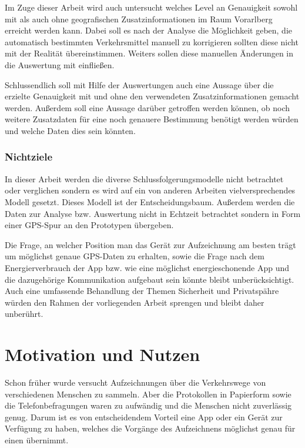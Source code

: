 Im Zuge dieser Arbeit wird auch untersucht welches Level an Genauigkeit sowohl mit als auch ohne geografischen Zusatzinformationen im Raum Vorarlberg erreicht werden kann. Dabei soll es nach der Analyse die Möglichkeit geben, die automatisch bestimmten Verkehrsmittel manuell zu korrigieren sollten diese nicht mit der Realität übereinstimmen. Weiters sollen diese manuellen Änderungen in die Auswertung mit einfließen. 

Schlussendlich soll mit Hilfe der Auswertungen auch eine Aussage über die erzielte Genauigkeit mit und ohne den verwendeten Zusatzinformationen gemacht werden. Außerdem soll eine Aussage darüber getroffen werden können, ob noch weitere Zusatzdaten für eine noch genauere Bestimmung benötigt werden würden und welche Daten dies sein könnten. 

\subsubsection{Nichtziele}

In dieser Arbeit werden die diverse Schlussfolgerungsmodelle nicht betrachtet oder verglichen sondern es wird auf ein von anderen Arbeiten vielversprechendes Modell gesetzt. Dieses Modell ist der Entscheidungsbaum. Außerdem werden die Daten zur Analyse bzw. Auswertung nicht in Echtzeit betrachtet sondern in Form einer GPS-Spur an den Prototypen übergeben.

Die Frage, an welcher Position man das Gerät zur Aufzeichnung am besten trägt um möglichst genaue GPS-Daten zu erhalten, sowie die Frage nach dem Energierverbrauch der App bzw. wie eine möglichst energieschonende App und die dazugehörige Kommunikation aufgebaut sein könnte bleibt unberücksichtigt. Auch eine umfassende Behandlung der Themen Sicherheit und Privatspähre würden den Rahmen der vorliegenden Arbeit sprengen und bleibt daher unberührt.

\section{Motivation und Nutzen}
Schon früher wurde versucht Aufzeichnungen über die Verkehrswege von verschiedenen Menschen zu sammeln. Aber die Protokollen in Papierform sowie die Telefonbefragungen waren zu aufwändig und die Menschen nicht zuverlässig genug. Darum ist es von entscheidendem Vorteil eine App oder ein Gerät zur Verfügung zu haben, welches die Vorgänge des Aufzeichnens möglichst genau für einen übernimmt. \cite{zheng_understanding_2010}

